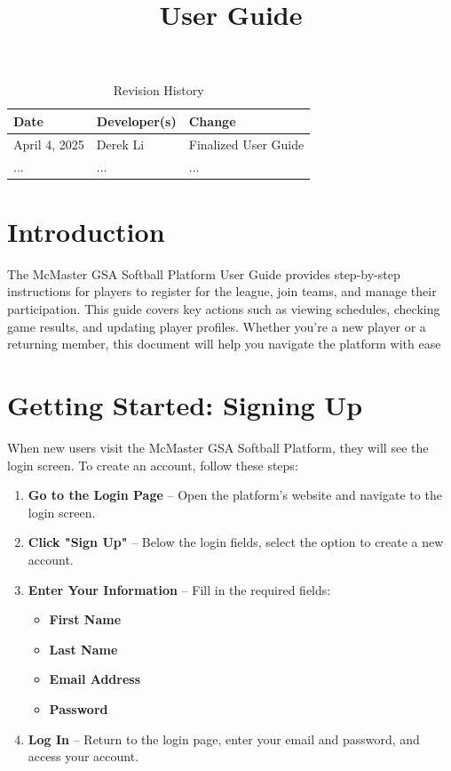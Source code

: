 \documentclass{article}
\title{User Guide\\\progname}
\author{\authname}
\date{}
\begin{document}
\begin{table}[hp]
\caption{Revision History} \label{TblRevisionHistory}
\begin{tabularx}{\textwidth}{llX}
\toprule
\textbf{Date} & \textbf{Developer(s)} & \textbf{Change}\\
\midrule
April 4, 2025 & Derek Li & Finalized User Guide\\
... & ... & ...\\
\bottomrule
\end{tabularx}
\end{table}

\newpage

\maketitle

\tableofcontents

\newpage

\section{Introduction}
The McMaster GSA Softball Platform User Guide provides step-by-step instructions for players to register for the league, join teams, and manage their participation. This guide covers key actions such as viewing schedules, checking game results, and updating player profiles. Whether you're a new player or a returning member, this document will help you navigate the platform with ease

\section{Getting Started: Signing Up}
When new users visit the McMaster GSA Softball Platform, they will see the login screen. To create an account, follow these steps:

\begin{enumerate}
    \item \textbf{Go to the Login Page} – Open the platform’s website and navigate to the login screen.
    \item \textbf{Click "Sign Up"} – Below the login fields, select the option to create a new account.
    \item \textbf{Enter Your Information} – Fill in the required fields:
    \begin{itemize}
        \item \textbf{First Name}
        \item \textbf{Last Name}
        \item \textbf{Email Address}
        \item \textbf{Password}
    \end{itemize}
    \item \textbf{Log In} – Return to the login page, enter your email and password, and access your account.
\end{enumerate}
\end{document}
